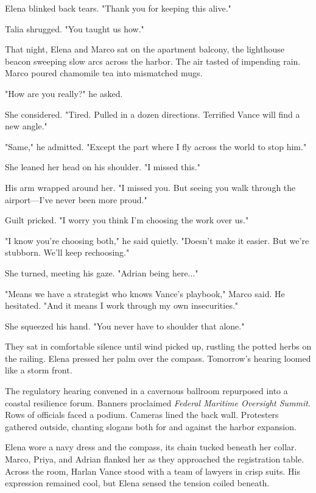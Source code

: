 Elena blinked back tears. "Thank you for keeping this alive."

Talia shrugged. "You taught us how."

\bigskip

That night, Elena and Marco sat on the apartment balcony, the lighthouse beacon sweeping slow arcs across the harbor. The air tasted of impending rain. Marco poured chamomile tea into mismatched mugs.

"How are you really?" he asked.

She considered. "Tired. Pulled in a dozen directions. Terrified Vance will find a new angle."

"Same," he admitted. "Except the part where I fly across the world to stop him."

She leaned her head on his shoulder. "I missed this."

His arm wrapped around her. "I missed you. But seeing you walk through the airport—I've never been more proud."

Guilt pricked. "I worry you think I'm choosing the work over us."

"I know you're choosing both," he said quietly. "Doesn't make it easier. But we're stubborn. We'll keep rechoosing."

She turned, meeting his gaze. "Adrian being here..."

"Means we have a strategist who knows Vance's playbook," Marco said. He hesitated. "And it means I work through my own insecurities."

She squeezed his hand. "You never have to shoulder that alone."

They sat in comfortable silence until wind picked up, rustling the potted herbs on the railing. Elena pressed her palm over the compass. Tomorrow's hearing loomed like a storm front.

\bigskip

The regulatory hearing convened in a cavernous ballroom repurposed into a coastal resilience forum. Banners proclaimed \textit{Federal Maritime Oversight Summit}. Rows of officials faced a podium. Cameras lined the back wall. Protesters gathered outside, chanting slogans both for and against the harbor expansion.

Elena wore a navy dress and the compass, its chain tucked beneath her collar. Marco, Priya, and Adrian flanked her as they approached the registration table. Across the room, Harlan Vance stood with a team of lawyers in crisp suits. His expression remained cool, but Elena sensed the tension coiled beneath.

